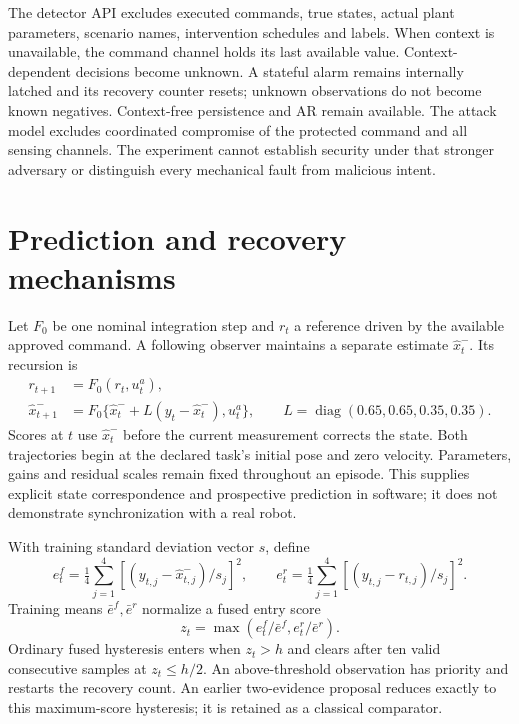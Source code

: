 The detector API excludes executed commands, true states, actual plant parameters, scenario names, intervention schedules and labels. When context is unavailable, the command channel holds its last available value. Context-dependent decisions become unknown. A stateful alarm remains internally latched and its recovery counter resets; unknown observations do not become known negatives. Context-free persistence and AR remain available. The attack model excludes coordinated compromise of the protected command and all sensing channels. The experiment cannot establish security under that stronger adversary or distinguish every mechanical fault from malicious intent.

\section{Prediction and recovery mechanisms}
Let $F_0$ be one nominal integration step and $r_t$ a reference driven by the available approved command. A following observer maintains a separate estimate $\hat x_t^-$. Its recursion is
\begin{align}
 r_{t+1}&=F_0(r_t,u_t^a),\\
 \hat x_{t+1}^-&=F_0\{\hat x_t^-+L(y_t-\hat x_t^-),u_t^a\},
 \qquad L=\operatorname{diag}(0.65,0.65,0.35,0.35).
\end{align}
Scores at $t$ use $\hat x_t^-$ before the current measurement corrects the state. Both trajectories begin at the declared task's initial pose and zero velocity. Parameters, gains and residual scales remain fixed throughout an episode. This supplies explicit state correspondence and prospective prediction in software; it does not demonstrate synchronization with a real robot.

With training standard deviation vector $s$, define
\begin{equation}
 e_t^f=\tfrac14\sum_{j=1}^{4}[(y_{t,j}-\hat x^-_{t,j})/s_j]^2,
 \qquad
 e_t^r=\tfrac14\sum_{j=1}^{4}[(y_{t,j}-r_{t,j})/s_j]^2.
\end{equation}
Training means $\bar e^f,\bar e^r$ normalize a fused entry score
\begin{equation}
 z_t=\max(e_t^f/\bar e^f,e_t^r/\bar e^r).
\end{equation}
Ordinary fused hysteresis enters when $z_t>h$ and clears after ten valid consecutive samples at $z_t\le h/2$. An above-threshold observation has priority and restarts the recovery count. An earlier two-evidence proposal reduces exactly to this maximum-score hysteresis; it is retained as a classical comparator.


